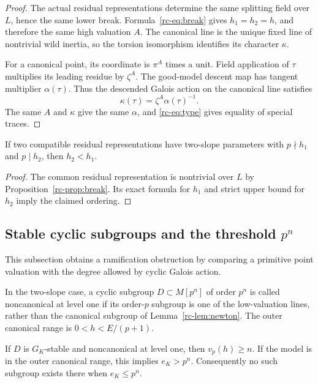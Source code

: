 \begin{proof}
The actual residual representations determine the same splitting field over
$L$, hence the same lower break. Formula~\eqref{rc-eq:break} gives
$h_1=h_2=h$, and therefore the same high valuation $A$.
The canonical line is the unique fixed line of nontrivial wild inertia,
so the torsion isomorphism identifies its character $\kappa$.

For a canonical point, its coordinate is $\pi^A$ times a unit.
Field application of $\tau$ multiplies its leading residue by $\zeta^A$.
The good-model descent map has tangent multiplier $\alpha(\tau)$.
Thus the descended Galois action on the canonical line satisfies
\begin{equation}\label{rc-eq:kappa}
 \kappa(\tau)=\zeta^A\alpha(\tau)^{-1}.
\end{equation}
The same $A$ and $\kappa$ give the same $\alpha$, and
\eqref{rc-eq:type} gives equality of special traces.
\end{proof}

\begin{corollary}\label{rc-cor:strictordering}
If two compatible residual representations have two-slope parameters with
$p\nmid h_1$ and $p\mid h_2$, then $h_2<h_1$.
\end{corollary}
\begin{proof}
The common residual representation is nontrivial over $L$ by
Proposition~\ref{rc-prop:break}. Its exact formula for $h_1$ and strict upper
bound for $h_2$ imply the claimed ordering.
\end{proof}

\subsection{Stable cyclic subgroups and the threshold \texorpdfstring{$p^n$}{p\^n}}
This subsection obtains a ramification obstruction by comparing a primitive point valuation with the degree allowed by cyclic Galois action.


\begin{definition}
In the two-slope case, a cyclic subgroup $D\subset M[p^n]$ of order $p^n$
is called noncanonical at level one if its order-$p$ subgroup is one of the
low-valuation lines, rather than the canonical subgroup of
Lemma~\ref{rc-lem:newton}.
The outer canonical range is $0<h<E/(p+1)$.
\end{definition}

\begin{theorem}\label{rc-thm:cyclic}
If $D$ is $G_K$-stable and noncanonical at level one, then
$v_p(h)\geq n$. If the model is in the outer canonical range, this implies
$e_K>p^n$. Consequently no such subgroup exists there when $e_K\leq p^n$.
\end{theorem}

